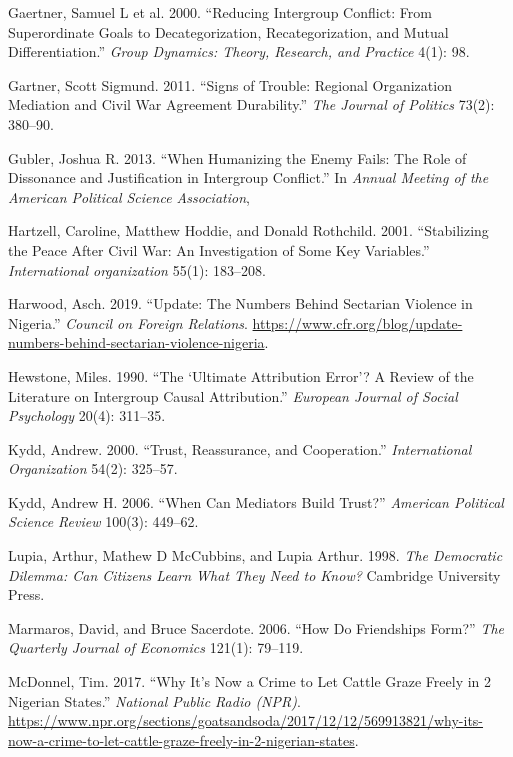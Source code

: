 \documentclass[11pt]{article}
\begin{document}
\hypertarget{ref-gaertner2000reducing}{}
Gaertner, Samuel L et al. 2000. ``Reducing Intergroup Conflict: From
Superordinate Goals to Decategorization, Recategorization, and Mutual
Differentiation.'' \emph{Group Dynamics: Theory, Research, and Practice}
4(1): 98.

\hypertarget{ref-gartner2011signs}{}
Gartner, Scott Sigmund. 2011. ``Signs of Trouble: Regional Organization
Mediation and Civil War Agreement Durability.'' \emph{The Journal of
Politics} 73(2): 380--90.

\hypertarget{ref-gubler2013humanizing}{}
Gubler, Joshua R. 2013. ``When Humanizing the Enemy Fails: The Role of
Dissonance and Justification in Intergroup Conflict.'' In \emph{Annual
Meeting of the American Political Science Association},

\hypertarget{ref-hartzell2001stabilizing}{}
Hartzell, Caroline, Matthew Hoddie, and Donald Rothchild. 2001.
``Stabilizing the Peace After Civil War: An Investigation of Some Key
Variables.'' \emph{International organization} 55(1): 183--208.

\hypertarget{ref-council2019nigeria}{}
Harwood, Asch. 2019. ``Update: The Numbers Behind Sectarian Violence in
Nigeria.'' \emph{Council on Foreign Relations}.
\url{https://www.cfr.org/blog/update-numbers-behind-sectarian-violence-nigeria}.

\hypertarget{ref-hewstone1990ultimate}{}
Hewstone, Miles. 1990. ``The `Ultimate Attribution Error'? A Review of
the Literature on Intergroup Causal Attribution.'' \emph{European
Journal of Social Psychology} 20(4): 311--35.

\hypertarget{ref-kydd2000trust}{}
Kydd, Andrew. 2000. ``Trust, Reassurance, and Cooperation.''
\emph{International Organization} 54(2): 325--57.

\hypertarget{ref-kydd2006can}{}
Kydd, Andrew H. 2006. ``When Can Mediators Build Trust?'' \emph{American
Political Science Review} 100(3): 449--62.

\hypertarget{ref-lupia1998democratic}{}
Lupia, Arthur, Mathew D McCubbins, and Lupia Arthur. 1998. \emph{The
Democratic Dilemma: Can Citizens Learn What They Need to Know?}
Cambridge University Press.

\hypertarget{ref-marmaros2006friendships}{}
Marmaros, David, and Bruce Sacerdote. 2006. ``How Do Friendships Form?''
\emph{The Quarterly Journal of Economics} 121(1): 79--119.

\hypertarget{ref-mcdonnel2017graze}{}
McDonnel, Tim. 2017. ``Why It's Now a Crime to Let Cattle Graze Freely
in 2 Nigerian States.'' \emph{National Public Radio (NPR)}.
\url{https://www.npr.org/sections/goatsandsoda/2017/12/12/569913821/why-its-now-a-crime-to-let-cattle-graze-freely-in-2-nigerian-states}.
\end{document}
